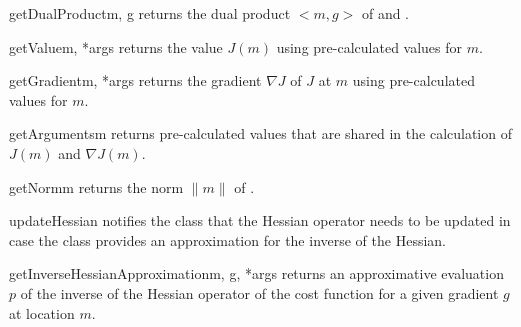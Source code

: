\begin{methoddesc}[CostFunction]{getDualProduct}{m, g}
returns the dual product $<m,g>$ of  and .
\end{methoddesc}
%
\begin{methoddesc}[CostFunction]{getValue}{m, *args}
returns the value $J(m)$ using pre-calculated values  for $m$.
\end{methoddesc}
%
\begin{methoddesc}[CostFunction]{getGradient}{m, *args}
returns the gradient $\nabla J$ of $J$ at $m$ using pre-calculated values  for $m$.
\end{methoddesc}
%
\begin{methoddesc}[CostFunction]{getArguments}{m}
returns pre-calculated values that are shared in the calculation of $J(m)$ and
$\nabla J(m)$.
\end{methoddesc}
%
\begin{methoddesc}[CostFunction]{getNorm}{m}
returns the norm $\|m\|$ of .
\end{methoddesc}
%
\begin{methoddesc}[CostFunction]{updateHessian}{}
notifies the class that the Hessian operator needs to be updated in case the
class provides an approximation for the inverse of the Hessian.
\end{methoddesc}
%
\begin{methoddesc}[CostFunction]{getInverseHessianApproximation}{m, g, *args}
returns an approximative evaluation $p$ of the inverse of the Hessian operator
of the cost function for a given gradient $g$ at location $m$.
\end{methoddesc}


% 

